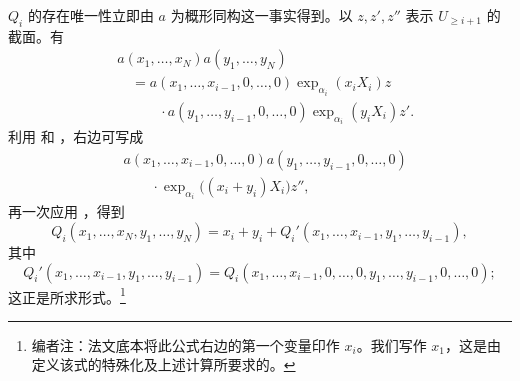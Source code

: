 \(Q_i\) 的存在唯一性立即由 \(a\) 为概形同构这一事实得到。以 \(z,z',z''\) 表示 \(U_{\geq i+1}\) 的截面。有
\[
\begin{split}
  &a(x_1,\ldots,x_N)a(y_1,\ldots,y_N)\\
  &\quad =
  a(x_1,\ldots,x_{i-1},0,\ldots,0)
  \exp_{\alpha_i}(x_iX_i)z\\
  &\qquad\quad{}\cdot
  a(y_1,\ldots,y_{i-1},0,\ldots,0)
  \exp_{\alpha_i}(y_iX_i)z'.
\end{split}
\]
利用  \textup{} 和 \textup{}，右边可写成
\[
\begin{split}
  &a(x_1,\ldots,x_{i-1},0,\ldots,0)
  a(y_1,\ldots,y_{i-1},0,\ldots,0)\\
  &\qquad{}\cdot
  \exp_{\alpha_i}\bigl((x_i+y_i)X_i\bigr)z'',
\end{split}
\]
再一次应用 ，得到
\[
  Q_i(x_1,\ldots,x_N,y_1,\ldots,y_N)
  =
  x_i+y_i+
  Q_i'(x_1,\ldots,x_{i-1},y_1,\ldots,y_{i-1}),
\]
其中
\[
  Q_i'(x_1,\ldots,x_{i-1},y_1,\ldots,y_{i-1})
  =
  Q_i(x_1,\ldots,x_{i-1},0,\ldots,0,
      y_1,\ldots,y_{i-1},0,\ldots,0);
\]
这正是所求形式。\footnote{编者注：法文底本将此公式右边的第一个变量印作 \(x_i\)。我们写作 \(x_1\)，这是由定义该式的特殊化及上述计算所要求的。}

